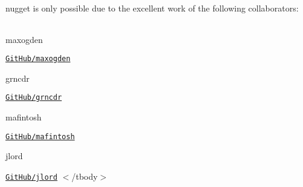 nugget is only possible due to the excellent work of the following collaborators\+:

\tabulinesep=1mm
\begin{longtabu} spread 0pt [c]{*{0}{|X[-1]}|}
\hline
\end{longtabu}


maxogden

\href{https://github.com/maxogden}{\tt Git\+Hub/maxogden} 

grncdr

\href{https://github.com/grncdr}{\tt Git\+Hub/grncdr} 

mafintosh

\href{https://github.com/mafintosh}{\tt Git\+Hub/mafintosh} 

jlord

\href{https://github.com/jlord}{\tt Git\+Hub/jlord} $<$/tbody$>$